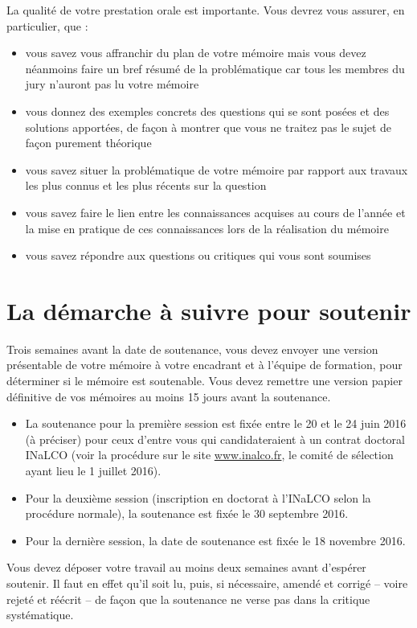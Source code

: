 La qualité de votre prestation orale est importante. Vous devrez vous assurer, en particulier, que :
\begin{itemize}
\item vous savez vous affranchir du plan de votre mémoire mais vous devez néanmoins faire un bref résumé de la problématique car tous les membres du jury n'auront pas lu votre mémoire
\item vous donnez des exemples concrets des questions qui se sont posées et des solutions apportées, de façon à montrer que vous ne traitez pas le sujet de façon purement théorique
\item vous savez situer la problématique de votre mémoire par rapport aux travaux les plus connus et les plus récents sur la question
\item vous savez faire le lien entre les connaissances acquises au cours de l'année et la mise en pratique de ces connaissances lors de la réalisation du mémoire
\item vous savez répondre aux questions ou critiques qui vous sont soumises
\end{itemize}

\section{La démarche à suivre pour soutenir}
Trois semaines avant la date de soutenance, vous devez envoyer une version présentable de votre mémoire à votre encadrant et à l'équipe de formation, pour déterminer si le mémoire est soutenable. Vous devez remettre une version papier définitive de vos mémoires au moins 15 jours avant la soutenance.
\begin{itemize}
\item La soutenance pour la première session est fixée entre le 20 et le 24 juin 2016 (à préciser) pour ceux d'entre vous qui candidateraient à un contrat doctoral INaLCO (voir la procédure sur le site \url{www.inalco.fr}, le comité de sélection ayant lieu le 1 juillet 2016).
\item Pour la deuxième session (inscription en doctorat à l'INaLCO selon la procédure normale), la soutenance est fixée le 30 septembre 2016.
\item Pour la dernière session, la date de soutenance est fixée le 18 novembre 2016.
\end{itemize}

Vous devez déposer votre travail au moins deux semaines avant d'espérer soutenir. Il faut en effet qu'il soit lu, puis, si nécessaire, amendé et corrigé -- voire rejeté et réécrit -- de façon que la soutenance ne verse pas dans la critique systématique.

